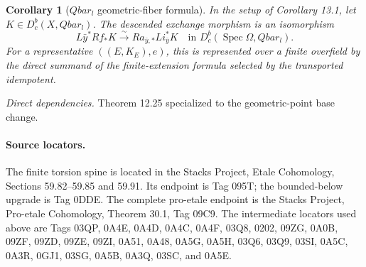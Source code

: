 \documentclass[10pt]{article}
\newtheorem{corollary}[theorem]{Corollary}
\theoremstyle{definition}
\newcommand{\Spec}{\operatorname{Spec}}
\newcommand{\Qlb}{\overline{\mathbf Q}_\ell}
\newcommand{\Dbc}{D^b_c}
\newcommand{\deps}[1]{\par\smallskip\textit{Direct dependencies.} #1\par}
\def\Qlb{Qbar_l}%
\begin{document}
\begin{corollary}[$\Qlb$ geometric-fiber formula]
In the setup of Corollary 13.1, let $K\in\Dbc(X,\Qlb)$.  The descended
exchange morphism is an isomorphism
\[
 L\bar y^*Rf_*K\xrightarrow{\sim}
 Ra_{\bar y,*}Li_{\bar y}^*K
 \quad\text{in }\Dbc(\Spec\Omega,\Qlb).
\]
For a representative $((E,K_E),e)$, this is represented over a finite
overfield by the direct summand of the finite-extension formula selected
by the transported idempotent.
\end{corollary}
\deps{Theorem 12.25 specialized to the geometric-point base change.}

\paragraph{Source locators.}
The finite torsion spine is located in the Stacks Project, Etale
Cohomology, Sections 59.82--59.85 and 59.91.  Its endpoint is Tag 095T;
the bounded-below upgrade is Tag 0DDE.  The complete pro-etale endpoint is
the Stacks Project, Pro-etale Cohomology, Theorem 30.1, Tag 09C9.  The
intermediate locators used above are Tags 03QP, 0A4E, 0A4D, 0A4C, 0A4F,
03Q8, 0202, 09ZG, 0A0B, 09ZF, 09ZD, 09ZE, 09ZI, 0A51, 0A48, 0A5G,
0A5H, 03Q6, 03Q9, 03SI, 0A5C, 0A3R, 0GJ1, 03SG, 0A5B, 0A3Q, 03SC,
and 0A5E.
\end{document}
